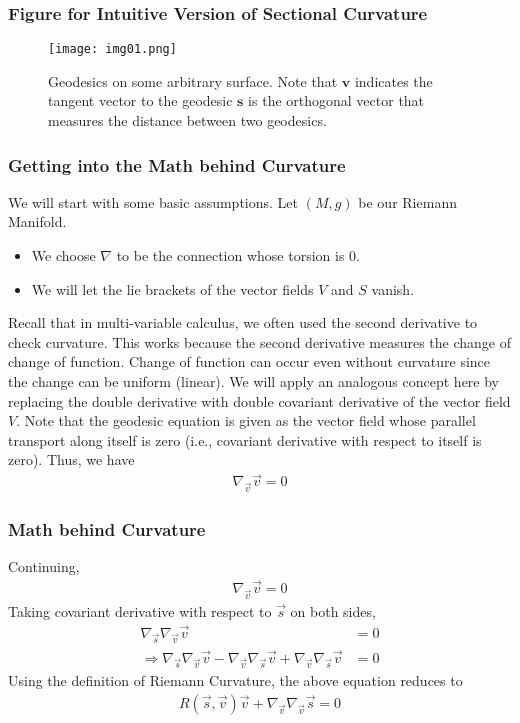 \begin{frame}
\frametitle{Figure for Intuitive Version of Sectional Curvature}
\begin{figure}[!htb]
	\centering
   \begin{minipage}{0.8\textwidth}
     \centering
     \texttt{[image: img01.png]}
     \caption{{Geodesics on some arbitrary surface. Note that $\mathbf{v}$ indicates the tangent vector to the geodesic $\mathbf{s}$ is the orthogonal vector that measures the distance between two geodesics.}}
     \label{fig:01}
   \end{minipage}
\end{figure}
\end{frame}
%
%
\begin{frame}
\frametitle{Getting into the Math behind Curvature}
We will start with some basic assumptions. Let $(M,g)$ be our Riemann Manifold.
\begin{itemize}
\item We choose $\nabla$ to be the connection whose torsion is $0$.
\item We will let the lie brackets of the vector fields $V$ and $S$ vanish.
\end{itemize}
\pause
Recall that in multi-variable calculus, we often used the second derivative to check curvature. This works because the second derivative measures the change of change of function. Change of function can occur even without curvature since the change can be uniform (linear). We will apply an analogous concept here by replacing the double derivative with double covariant derivative of the vector field $V$.
\pause
Note that the geodesic equation is given as the vector field whose parallel transport along itself is zero (i.e., covariant derivative with respect to itself is zero).
Thus, we have
\begin{align}
\nabla_{\vec{v}} \vec{v}=0
\end{align}
\end{frame}

\begin{frame}
\frametitle{Math behind Curvature}
Continuing,
\begin{align}
\nabla_{\vec{v}} \vec{v}=0
\end{align}
Taking covariant derivative with respect to $\vec{s}$ on both sides,
\begin{align}
\nabla_{\vec{s}}\nabla_{\vec{v}} \vec{v}&=0\\
\Rightarrow \nabla_{\vec{s}}\nabla_{\vec{v}} \vec{v}-\nabla_{\vec{v}}\nabla_{\vec{s}} \vec{v}+\nabla_{\vec{v}}\nabla_{\vec{s}} \vec{v}&=0
\end{align}
Using the definition of Riemann Curvature, the above equation reduces to
\begin{align}
\label{main_eq}
R(\vec{s},\vec{v})\vec{v}+\nabla_{\vec{v}}\nabla_{\vec{v}} \vec{s}=0
\end{align}
\end{frame}


